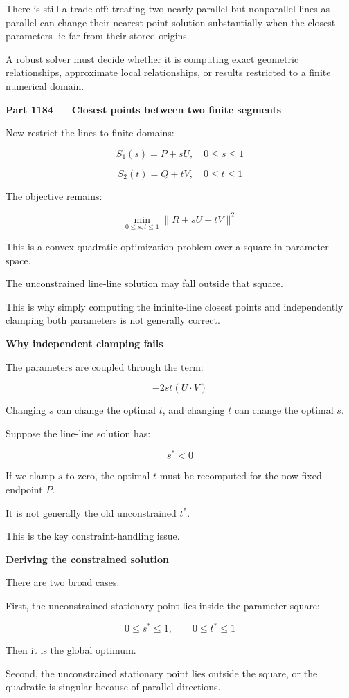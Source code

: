 There is still a trade-off: treating two nearly parallel but nonparallel lines as parallel can change their nearest-point solution substantially when the closest parameters lie far from their stored origins.

A robust solver must decide whether it is computing exact geometric relationships, approximate local relationships, or results restricted to a finite numerical domain.

\textbf{Part 1184 --- Closest points between two finite segments}

Now restrict the lines to finite domains:

\[
S_1(s)=P+sU,\quad 0\le s\le1
\]

\[
S_2(t)=Q+tV,\quad 0\le t\le1
\]

The objective remains:

\[
\boxed{ \min_{0\le s,t\le1} \|R+sU-tV\|^2 }
\]

This is a convex quadratic optimization problem over a square in parameter space.

The unconstrained line-line solution may fall outside that square.

This is why simply computing the infinite-line closest points and independently clamping both parameters is not generally correct.

\textbf{Why independent clamping fails}

The parameters are coupled through the term:

\[
-2st(U\cdot V)
\]

Changing \(s\) can change the optimal \(t\), and changing \(t\) can change the optimal \(s\).

Suppose the line-line solution has:

\[
s^*<0
\]

If we clamp \(s\) to zero, the optimal \(t\) must be recomputed for the now-fixed endpoint \(P\).

It is not generally the old unconstrained \(t^*\).

This is the key constraint-handling issue.

\textbf{Deriving the constrained solution}

There are two broad cases.

First, the unconstrained stationary point lies inside the parameter square:

\[
0\le s^*\le1,\qquad0\le t^*\le1
\]

Then it is the global optimum.

Second, the unconstrained stationary point lies outside the square, or the quadratic is singular because of parallel directions.

